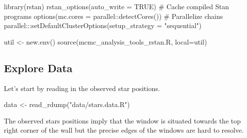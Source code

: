 \documentclass[
  letterpaper,
  DIV=11,
  numbers=noendperiod]{scrartcl}
\newenvironment{Shaded}{\begin{snugshade}}{\end{snugshade}}
\newcommand{\AttributeTok}[1]{\textcolor[rgb]{0.40,0.45,0.13}{#1}}
\newcommand{\CommentTok}[1]{\textcolor[rgb]{0.37,0.37,0.37}{#1}}
\newcommand{\ConstantTok}[1]{\textcolor[rgb]{0.56,0.35,0.01}{#1}}
\newcommand{\FunctionTok}[1]{\textcolor[rgb]{0.28,0.35,0.67}{#1}}
\newcommand{\NormalTok}[1]{\textcolor[rgb]{0.00,0.23,0.31}{#1}}
\newcommand{\OtherTok}[1]{\textcolor[rgb]{0.00,0.23,0.31}{#1}}
\newcommand{\SpecialCharTok}[1]{\textcolor[rgb]{0.37,0.37,0.37}{#1}}
\newcommand{\StringTok}[1]{\textcolor[rgb]{0.13,0.47,0.30}{#1}}
\begin{document}
\begin{Shaded}
\begin{Highlighting}[]
\FunctionTok{library}\NormalTok{(rstan)}
\FunctionTok{rstan\_options}\NormalTok{(}\AttributeTok{auto\_write =} \ConstantTok{TRUE}\NormalTok{)            }\CommentTok{\# Cache compiled Stan programs}
\FunctionTok{options}\NormalTok{(}\AttributeTok{mc.cores =}\NormalTok{ parallel}\SpecialCharTok{::}\FunctionTok{detectCores}\NormalTok{()) }\CommentTok{\# Parallelize chains}
\NormalTok{parallel}\SpecialCharTok{:::}\FunctionTok{setDefaultClusterOptions}\NormalTok{(}\AttributeTok{setup\_strategy =} \StringTok{"sequential"}\NormalTok{)}

\NormalTok{util }\OtherTok{\textless{}{-}} \FunctionTok{new.env}\NormalTok{()}
\FunctionTok{source}\NormalTok{(}\StringTok{\textquotesingle{}mcmc\_analysis\_tools\_rstan.R\textquotesingle{}}\NormalTok{, }\AttributeTok{local=}\NormalTok{util)}
\end{Highlighting}
\end{Shaded}

\subsection{Explore Data}\label{explore-data}

Let's start by reading in the observed star positions.

\begin{Shaded}
\begin{Highlighting}[]
\NormalTok{data }\OtherTok{\textless{}{-}} \FunctionTok{read\_rdump}\NormalTok{(}\StringTok{"data/stars.data.R"}\NormalTok{)}
\end{Highlighting}
\end{Shaded}

The observed stars positions imply that the window is situated towards
the top right corner of the wall but the precise edges of the windows
are hard to resolve.
\end{document}
